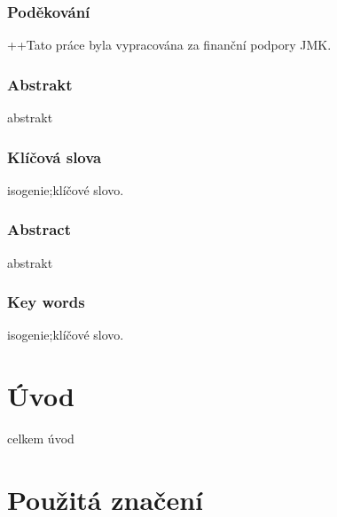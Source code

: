 \documentclass [12pt]{report}
\begin{document}
\subsection*{Poděkování}
++Tato práce byla vypracována za finanční podpory JMK.


\newpage
\thispagestyle{empty}
\subsection*{Abstrakt}
abstrakt


\subsection*{Klíčová slova}
isogenie;klíčové slovo.


\vspace*{4cm}

\subsection*{Abstract}
abstrakt

\subsection*{Key words}
isogenie;klíčové slovo.






\tableofcontents
\thispagestyle{empty}

\chapter*{Úvod}

celkem úvod




\chapter*{Použitá značení}
\end{document}
